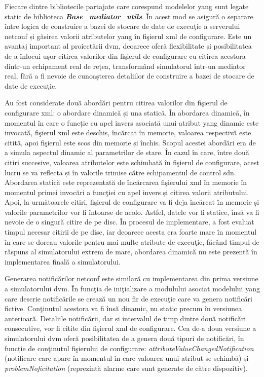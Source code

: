 Fiecare dintre bibliotecile partajate care corespund modelelor \gls{yang} sunt legate static de biblioteca \textit{\textbf{Base\_mediator\_utils}}. În acest mod se asigură o separare între logica de construire a bazei de stocare de date de execuţie a serverului \gls{netconf} și găsirea valorii atributelor \gls{yang} în fişierul \gls{xml} de configurare. Este un avantaj important al proiectării \gls{dvm}, deoarece oferă flexibilitate și posibilitatea de a înlocui uşor citirea valorilor din fişierul de configurare cu citirea acestora dintr-un echipament real de rețea, transformând simulatorul într-un mediator real, fără a fi nevoie de cunoașterea detaliilor de construire a bazei de stocare de date de execuţie.

Au fost considerate două abordări pentru citirea valorilor din fişierul de configurare \gls{xml}: o abordare dinamică și una statică. În abordarea dinamică, în momentul în care o funcție cu apel invers asociată unui atribut \gls{yang} dinamic este invocată, fişierul \gls{xml} este deschis, încărcat în memorie, valoarea respectivă este citită, apoi fişierul este scos din memorie și închis. Scopul acestei abordări era de a simula aspectul dinamic al parametrilor de stare. În cazul în care, între două citiri succesive, valoarea atributelor este schimbată în fişierul de configurare, acest lucru se va reflecta și în valorile trimise către echipamentul de control \gls{sdn}. Abordarea statică este reprezentată de încărcarea fişierului \gls{xml} în memorie în momentul primei invocări a funcţiei cu apel invers și citirea valorii atributului. Apoi, la următoarele citiri, fişierul de configurare va fi deja încărcat în memorie și valorile parametrilor vor fi întoarse de acolo. Astfel, datele vor fi statice, însă va fi nevoie de o singură citire de pe disc. În procesul de implementare, a fost evaluat timpul necesar citirii de pe disc, iar deoarece acesta era foarte mare în momentul în care se doreau valorile pentru mai multe atribute de execuţie, făcând timpul de răspuns al simulatorului extrem de mare, abordarea dinamică nu este prezentă în implementarea finală a simulatorului.

Generarea notificărilor \gls{netconf} este similară cu implementarea din prima versiune a simulatorului \gls{dvm}. În funcţia de iniţializare a modulului asociat modelului \gls{yang} care descrie notificările se crează un nou fir de execuţie care va genera notificări fictive. Conţinutul acestora va fi însă dinamic, nu static precum în versiunea anterioară. Detaliile notificării, dar și intervalul de timp dintre două notificări consecutive, vor fi citite din fişierul \gls{xml} de configurare. Cea de-a doua versiune a simulatorului \gls{dvm} oferă posibilitatea de a genera două tipuri de notificări, în funcție de conţinutul fişierului de configurare: \textit{attributeValueChangedNotification} (notificare care apare în momentul în care valoarea unui atribut se schimbă) și \textit{problemNoficitation} (reprezintă alarme care sunt generate de către dispozitiv).

